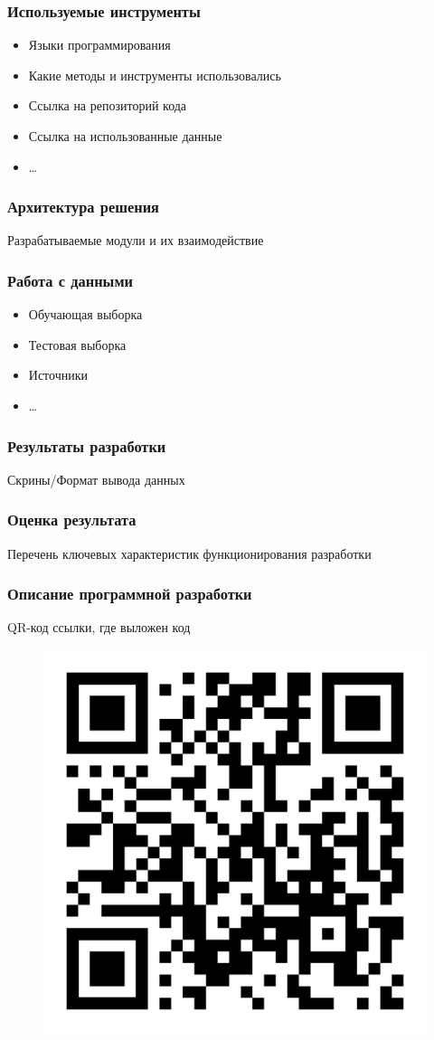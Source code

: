 \documentclass[pdf, hyperref={unicode}, aspectratio=169]{beamer}
\begin{document}
\begin{frame}
\frametitle{Используемые инструменты}

\begin{itemize}
	\item Языки программирования
	\item Какие методы и инструменты использовались
	\item Ссылка на репозиторий кода
	\item Ссылка на использованные данные
	\item …
\end{itemize}
\end{frame}


\begin{frame}
\frametitle{Архитектура решения}

Разрабатываемые модули и их взаимодействие
\end{frame}


\begin{frame}
\frametitle{Работа с данными}

\begin{itemize}
	\item Обучающая выборка
	\item Тестовая выборка
	\item Источники
	\item …
\end{itemize}
\end{frame}


\begin{frame}
\frametitle{Результаты разработки}

Скрины/Формат вывода данных
\end{frame}


\begin{frame}
\frametitle{Оценка результата}

Перечень ключевых характеристик функционирования разработки
\end{frame}


\begin{frame}
\frametitle{Описание программной разработки}

QR-код ссылки, где выложен код

\begin{figure}
\includegraphics[height=0.7\textheight]{img/qr-code}
\end{figure}
\end{frame}
\end{document}
